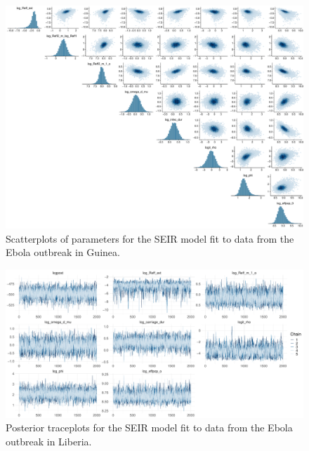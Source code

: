 \begin{figure}[htbp]
	\centering
	\includegraphics[width=\linewidth]{figures/guin_tight_pairs}
	\caption{Scatterplots of parameters for the SEIR model fit to data from the Ebola outbreak in Guinea.}
	\label{fig:guineapairs}
\end{figure}

\begin{figure}
	\centering
	\includegraphics[width=\linewidth]{figures/lib_tight_traces}
	\caption{Posterior traceplots for the SEIR model fit to data from the Ebola outbreak in Liberia.}
	\label{fig:liberiatraces}
\end{figure}

